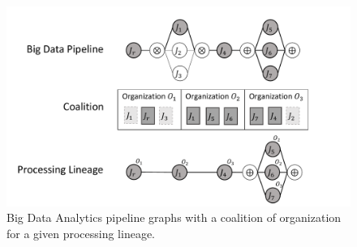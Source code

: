 


\begin{figure}[!t]
    \includegraphics[width=0.98\columnwidth]{generaleFig1.pdf}
    \caption{Big Data Analytics pipeline graphs with a coalition of organization for a given processing lineage.}%
\end{figure}

